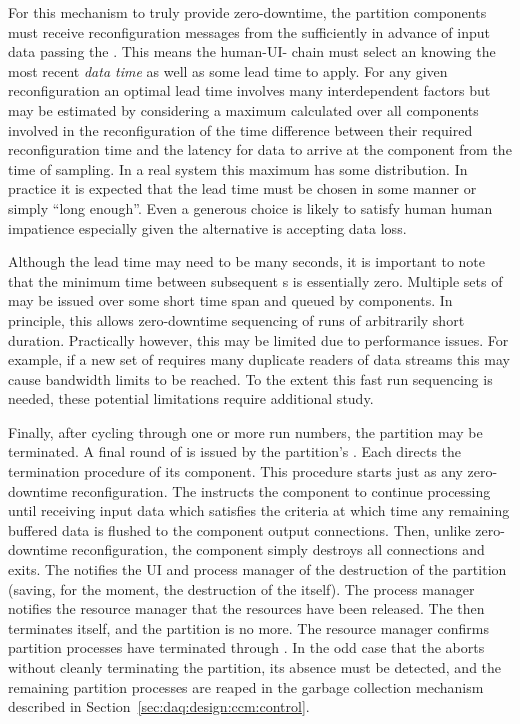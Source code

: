 For this mechanism to truly provide zero-downtime, the partition components must receive reconfiguration messages from the  sufficiently in advance of input data passing the .
This means the human-UI- chain must select an  knowing the most recent \textit{data time} as well as some lead time to apply.  
For any given reconfiguration an optimal lead time involves many interdependent factors but may be estimated by considering a maximum calculated over all components involved in the reconfiguration of the time difference between their required reconfiguration time and the latency for data to arrive at the component from the time of sampling. 
In a real system this maximum has some distribution. 
In practice it is expected that the lead time must be chosen in some %
manner or simply ``long enough''.
Even a generous choice is likely to satisfy human human impatience especially given the alternative is accepting data loss.

Although the lead time may need to be many seconds, it is important to note that the minimum time between subsequent s is essentially zero. 
Multiple sets of  may be issued over some short time span and queued by components. 
In principle, this allows zero-downtime sequencing of runs of arbitrarily short duration.
Practically however, this may be limited due to performance issues. 
For example, if a new set of  requires many duplicate readers of data streams this may cause bandwidth limits to be reached. 
To the extent this fast run sequencing is needed, these potential limitations require additional study.

Finally, after cycling through one or more run numbers, the partition may be terminated. 
A final round of  is issued by the partition's . 
Each  directs the termination procedure of its component. 
This procedure starts just as any zero-downtime reconfiguration. 
The  instructs the component to continue processing until receiving input data which satisfies the  criteria at which time any remaining buffered data is flushed to the component output connections. 
Then, unlike zero-downtime reconfiguration, the component simply destroys all connections and exits. 
The  notifies the UI and process manager of the destruction of the partition (saving, for the moment, the destruction of the  itself). 
The process manager notifies the resource manager that the resources have been released. 
The  then terminates itself, and the partition is no more.
The resource manager confirms partition processes have terminated through . 
In the odd case that the  aborts without cleanly terminating the partition, its absence must be detected, and the remaining partition processes are reaped in the garbage collection mechanism described in Section~\ref{sec:daq:design:ccm:control}.

